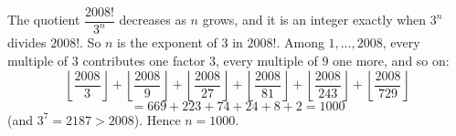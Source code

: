 The quotient $\dfrac{2008!}{3^n}$ decreases as $n$ grows, and it is an integer exactly when $3^n$ divides $2008!$. So $n$ is the exponent of $3$ in $2008!$. Among $1,\dots,2008$, every multiple of $3$ contributes one factor $3$, every multiple of $9$ one more, and so on:
\[\left\lfloor\dfrac{2008}{3}\right\rfloor+\left\lfloor\dfrac{2008}{9}\right\rfloor+\left\lfloor\dfrac{2008}{27}\right\rfloor+\left\lfloor\dfrac{2008}{81}\right\rfloor+\left\lfloor\dfrac{2008}{243}\right\rfloor+\left\lfloor\dfrac{2008}{729}\right\rfloor\]
\[=669+223+74+24+8+2=1000\]
(and $3^7=2187>2008$). Hence $n=\boxed{1000}$.

